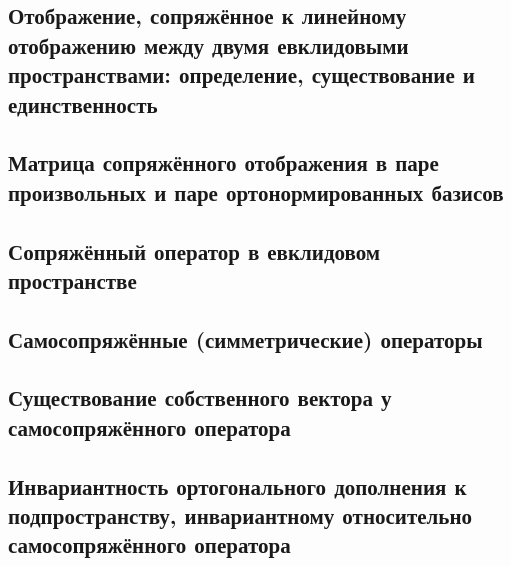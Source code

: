 \subsection{Отображение, сопряжённое к линейному отображению между двумя евклидовыми пространствами: определение, существование и единственность}
\subsection{Матрица сопряжённого отображения в паре произвольных и паре ортонормированных базисов}
\subsection{Сопряжённый оператор в евклидовом пространстве}
\subsection{Самосопряжённые (симметрические) операторы}
\subsection{Существование собственного вектора у самосопряжённого оператора}
\subsection{Инвариантность ортогонального дополнения к подпространству, инвариантному относительно самосопряжённого оператора}

